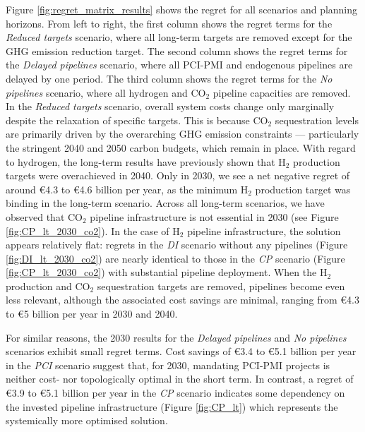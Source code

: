 \documentclass[pdflatex,sn-nature]{sn-jnl}
\theoremstyle{thmstyleone}%
\theoremstyle{thmstyletwo}%
\theoremstyle{thmstylethree}%
\begin{document}
Figure \ref{fig:regret_matrix_results} shows the regret for all scenarios and planning horizons. From left to right, the first column shows the regret terms for the \textit{Reduced targets} scenario, where all long-term targets are removed except for the GHG emission reduction target. The second column shows the regret terms for the \textit{Delayed pipelines} scenario, where all PCI-PMI and endogenous pipelines are delayed by one period. The third column shows the regret terms for the \textit{No pipelines} scenario, where all hydrogen and CO$_2$ pipeline capacities are removed.
In the \textit{Reduced targets} scenario, overall system costs change only marginally despite the relaxation of specific targets. This is because CO$_2$ sequestration levels are primarily driven by the overarching GHG emission constraints --- particularly the stringent 2040 and 2050 carbon budgets, which remain in place. With regard to hydrogen, the long-term results have previously shown that H$_2$ production targets were overachieved in 2040. Only in 2030, we see a net negative regret of around €4.3 to €4.6 billion per year, as the minimum H$_2$ production target was binding in the long-term scenario. Across all long-term scenarios, we have observed that CO$_2$ pipeline infrastructure is not essential in 2030 (see Figure \ref{fig:CP_lt_2030_co2}). In the case of H$_2$ pipeline infrastructure, the solution appears relatively flat: regrets in the \textit{DI} scenario without any pipelines (Figure \ref{fig:DI_lt_2030_co2}) are nearly identical to those in the \textit{CP} scenario (Figure \ref{fig:CP_lt_2030_co2}) with substantial pipeline deployment. When the H$_2$ production and CO$_2$ sequestration targets are removed, pipelines become even less relevant, although the associated cost savings are minimal, ranging from €4.3 to €5 billion per year in 2030 and 2040.

For similar reasons, the 2030 results for the \textit{Delayed pipelines} and \textit{No pipelines} scenarios exhibit small regret terms. Cost savings of €3.4 to €5.1 billion per year in the \textit{PCI} scenario suggest that, for 2030, mandating PCI-PMI projects is neither cost- nor topologically optimal in the short term. In contrast, a regret of €3.9 to €5.1 billion per year in the \textit{CP} scenario indicates some dependency on the invested pipeline infrastructure (Figure \ref{fig:CP_lt}) which represents the systemically more optimised solution.
\end{document}
